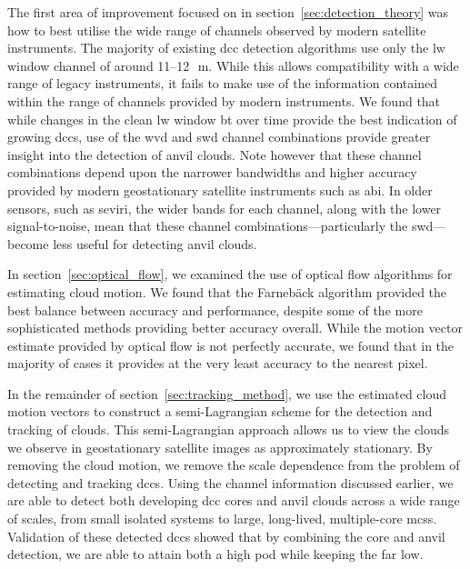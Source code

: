 The first area of improvement focused on in section~\ref{sec:detection_theory} was how to best utilise the wide range of channels observed by modern satellite instruments.
The majority of existing \acrshort{dcc} detection algorithms use only the \acrshort{lw} window channel of around 11--12\,\unit{\mu m}.
While this allows compatibility with a wide range of legacy instruments, it fails to make use of the information contained within the range of channels provided by modern instruments.
We found that while changes in the clean \acrshort{lw} window \acrshort{bt} over time provide the best indication of growing \acrshort{dcc}s, use of the \acrshort{wvd} and \acrshort{swd} channel combinations provide greater insight into the detection of anvil clouds.
Note however that these channel combinations depend upon the narrower bandwidths and higher accuracy provided by modern geostationary satellite instruments such as \acrshort{abi}.
In older sensors, such as \acrshort{seviri}, the wider bands for each channel, along with the lower signal-to-noise, mean that these channel combinations---particularly the \acrshort{swd}---become less useful for detecting anvil clouds.

In section~\ref{sec:optical_flow}, we examined the use of optical flow algorithms for estimating cloud motion.
We found that the Farnebäck algorithm provided the best balance between accuracy and performance, despite some of the more sophisticated methods providing better accuracy overall.
While the motion vector estimate provided by optical flow is not perfectly accurate, we found that in the majority of cases it provides at the very least accuracy to the nearest pixel.

In the remainder of section~\ref{sec:tracking_method}, we use the estimated cloud motion vectors to construct a semi-Lagrangian scheme for the detection and tracking of clouds.
This semi-Lagrangian approach allows us to view the clouds we observe in geostationary satellite images as approximately stationary.
By removing the cloud motion, we remove the scale dependence from the problem of detecting and tracking \acrshort{dcc}s.
Using the channel information discussed earlier, we are able to detect both developing \acrshort{dcc} cores and anvil clouds across a wide range of scales, from small isolated systems to large, long-lived, multiple-core \acrshort{mcs}s.
Validation of these detected \acrshort{dcc}s showed that by combining the core and anvil detection, we are able to attain both a high \acrshort{pod} while keeping the \acrshort{far} low.

